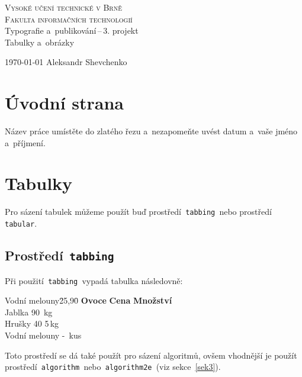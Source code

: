 \documentclass[11pt, a4paper]{article}
\begin{document}
\shorthandoff{-}



\begin{titlepage}
\begin{center}
    \huge
    \textsc{\Huge Vysoké učení technické v Brně\\
    \huge Fakulta informačních technologií}\\
    \LARGE Typografie a~publikování\,--\,3. projekt\\
    \Huge Tabulky a~obrázky\\
\end{center}
{\Large \today \hfill
Aleksandr Shevchenko}
\end{titlepage}



\section{Úvodní strana}
Název práce umístěte do zlatého řezu a~nezapomeňte uvést  datum a~vaše jméno a~příjmení.

\section{Tabulky}
Pro sázení tabulek můžeme použít buď prostředí\texttt{ tabbing }nebo prostředí\texttt{ tabular}.

\subsection{Prostředí\texttt{ tabbing}}

Při použití\texttt{ tabbing }vypadá tabulka následovně:

\begin{tabbing}
    Vodní melouny\quad \= 25,90\quad \= \kill
    \textbf{Ovoce}  \> \textbf{Cena}\> \textbf{Množství} \\
    Jablka          90        \,kg \\
    Hrušky          40        5\,kg \\
    Vodní melouny   -         \,kus \\
\end{tabbing}
Toto prostředí se dá také použít pro sázení algoritmů, ovšem vhodnější je použít prostředí\texttt{ algorithm }nebo\texttt{ algorithm2e }(viz sekce~\ref{sek3}).
\end{document}

